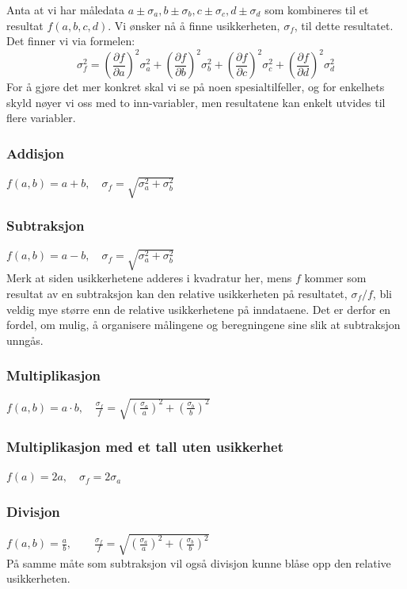 Anta at vi har måledata $a\pm\sigma_a,b\pm\sigma_b,c\pm\sigma_c,d\pm\sigma_d$ som kombineres til et resultat $f(a,b,c,d)$. Vi ønsker nå å finne usikkerheten, $\sigma_f$, til dette resultatet. Det finner vi via formelen:
\begin{displaymath}
	\sigma_f^2 =
	\left(\frac{\partial f}{\partial a}\right)^2\sigma_a^2 + \left(\frac{\partial f}{\partial b}\right)^2\sigma_b^2 + 
	\left(\frac{\partial f}{\partial c}\right)^2\sigma_c^2 + \left(\frac{\partial f}{\partial d}\right)^2\sigma_d^2 
\end{displaymath}
For å gjøre det mer konkret skal vi se på noen spesialtilfeller, og for enkelhets skyld nøyer vi oss med to inn-variabler, men resultatene kan enkelt utvides til flere variabler.
\subsubsection*{Addisjon}
$f(a,b) = a + b,\quad	\sigma_f = \sqrt{\sigma_a^2 + \sigma_b^2}$
\subsubsection*{Subtraksjon}
$f(a,b) = a - b, \quad	\sigma_f =\sqrt{ \sigma_a^2 + \sigma_b^2}$ \\
Merk at siden usikkerhetene adderes i kvadratur her, mens $f$ kommer som resultat av en subtraksjon kan den relative usikkerheten på resultatet, $\sigma_f/f$, bli veldig mye større enn de relative usikkerhetene på inndataene. Det er derfor en fordel, om mulig, å organisere målingene og beregningene sine slik at subtraksjon unngås.
\subsubsection*{Multiplikasjon}
$f(a,b) = a\cdot b, 
\quad  \frac{\sigma_f}{f} = \sqrt{\left(\frac{\sigma_a}{a}\right)^2 + \left(\frac{\sigma_b}{b}\right)^2}$
\subsubsection*{Multiplikasjon med et tall uten usikkerhet}
$f(a) = 2a, \quad \sigma_f = 2\sigma_a$
\subsubsection*{Divisjon}
$f(a,b) = \frac{a}{b}, \quad 
\quad  \frac{\sigma_f}{f}= \sqrt{\left(\frac{\sigma_a}{a}\right)^2 + \left(\frac{\sigma_b}{b}\right)^2}$\\
På samme måte som subtraksjon vil også divisjon kunne blåse opp den relative usikkerheten.

